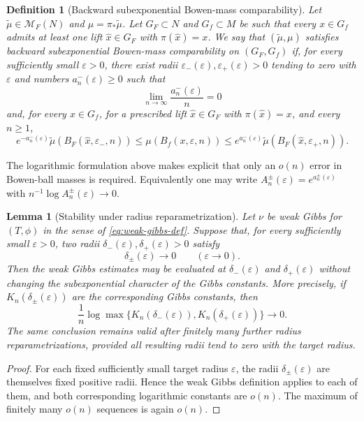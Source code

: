 \documentclass[11pt,a4paper]{article}
\newtheorem{lemma}[theorem]{Lemma}
\newtheorem{definition}[theorem]{Definition}
\newcommand{\M}{\mathcal M}
\newcommand{\eps}{\varepsilon}
\begin{document}
\begin{definition}[Backward subexponential Bowen-mass comparability]
\label{def:backward-bowen-comparison}
Let $\widetilde\mu\in\M_F(N)$ and $\mu=\pi_*\widetilde\mu$. Let
$G_F\subset N$ and $G_f\subset M$ be such that every $x\in G_f$ admits
at least one lift $\hat x\in G_F$ with $\pi(\hat x)=x$. We say that
$(\widetilde\mu,\mu)$ satisfies \emph{backward subexponential Bowen-mass
comparability on $(G_F,G_f)$} if, for every sufficiently small $\eps>0$,
there exist radii $\eps_-(\eps),\eps_+(\eps)>0$ tending to zero with
$\eps$ and numbers $a_n^{-}(\eps)\ge0$ such that
\[
\lim_{n\to\infty}\frac{a_n^{-}(\eps)}n=0
\]
and, for every $x\in G_f$, for a prescribed lift $\hat x\in G_F$ with
$\pi(\hat x)=x$, and every $n\ge1$,
\begin{equation}
e^{-a_n^{-}(\eps)}\widetilde\mu(B_F(\hat x,\eps_-,n))
\le \mu(B_f(x,\eps,n))
\le e^{a_n^{-}(\eps)}\widetilde\mu(B_F(\hat x,\eps_+,n)).
\label{eq:bowen-comp-backward}
\end{equation}
\end{definition}

The logarithmic formulation above makes explicit that only an $o(n)$ error
in Bowen-ball masses is required. Equivalently one may write
$A_n^{\pm}(\eps)=e^{a_n^{\pm}(\eps)}$ with
$n^{-1}\log A_n^{\pm}(\eps)\to0$.

\begin{lemma}[Stability under radius reparametrization]
\label{lem:radius-reparametrization}
Let $\nu$ be weak Gibbs for $(T,\phi)$ in the sense of
\eqref{eq:weak-gibbs-def}. Suppose that, for every sufficiently small
$\eps>0$, two radii $\delta_-(\eps),\delta_+(\eps)>0$ satisfy
\[
\delta_\pm(\eps)\longrightarrow0\qquad(\eps\to0).
\]
Then the weak Gibbs estimates may be evaluated at
$\delta_-(\eps)$ and $\delta_+(\eps)$ without changing the subexponential
character of the Gibbs constants. More precisely, if
$K_n(\delta_\pm(\eps))$ are the corresponding Gibbs constants, then
\[
\frac1n\log
\max\{K_n(\delta_-(\eps)),K_n(\delta_+(\eps))\}\longrightarrow0.
\]
The same conclusion remains valid after finitely many further radius
reparametrizations, provided all resulting radii tend to zero with the
target radius.
\end{lemma}

\begin{proof}
For each fixed sufficiently small target radius $\eps$, the radii
$\delta_\pm(\eps)$ are themselves fixed positive radii. Hence the weak Gibbs
definition applies to each of them, and both corresponding logarithmic
constants are $o(n)$. The maximum of finitely many $o(n)$ sequences is again
$o(n)$.
\end{proof}
\end{document}
